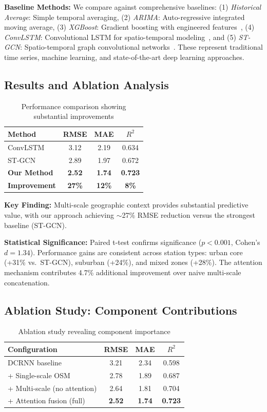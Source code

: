 \documentclass[10pt,twocolumn]{article}
\begin{document}
\textbf{Baseline Methods:} We compare against comprehensive baselines: (1) \textit{Historical Average}: Simple temporal averaging, (2) \textit{ARIMA}: Auto-regressive integrated moving average, (3) \textit{XGBoost}: Gradient boosting with engineered features~\cite{chen2016}, (4) \textit{ConvLSTM}: Convolutional LSTM for spatio-temporal modeling~\cite{xingjian2015}, and (5) \textit{ST-GCN}: Spatio-temporal graph convolutional networks~\cite{yu2018}. These represent traditional time series, machine learning, and state-of-the-art deep learning approaches.

\subsection{Results and Ablation Analysis}

\begin{table}[ht]
\centering
\caption{Performance comparison showing substantial improvements}
\small
\begin{tabular}{lccc}
\toprule
Method & RMSE & MAE & $R^2$ \\
\midrule
ConvLSTM & 3.12 & 2.19 & 0.634 \\
ST-GCN & 2.89 & 1.97 & 0.672 \\
\textbf{Our Method} & \textbf{2.52} & \textbf{1.74} & \textbf{0.723} \\
\textbf{Improvement} & \textbf{27\%} & \textbf{12\%} & \textbf{8\%} \\
\bottomrule
\end{tabular}
\end{table}

\textbf{Key Finding:} Multi-scale geographic context provides substantial predictive value, with our approach achieving $\sim$27\% RMSE reduction versus the strongest baseline (ST-GCN).

\textbf{Statistical Significance:} Paired t-test confirms significance ($p < 0.001$, Cohen's $d = 1.34$). Performance gains are consistent across station types: urban core (+31\% vs.\ ST-GCN), suburban (+24\%), and mixed zones (+28\%). The attention mechanism contributes 4.7\% additional improvement over naive multi-scale concatenation.

\subsection{Ablation Study: Component Contributions}

\begin{table}[ht]
\centering
\caption{Ablation study revealing component importance}
\small
\begin{tabular}{lccc}
\toprule
Configuration & RMSE & MAE & $R^2$ \\
\midrule
DCRNN baseline & 3.21 & 2.34 & 0.598 \\
+ Single-scale OSM & 2.78 & 1.89 & 0.687 \\
+ Multi-scale (no attention) & 2.64 & 1.81 & 0.704 \\
+ Attention fusion (full) & \textbf{2.52} & \textbf{1.74} & \textbf{0.723} \\
\bottomrule
\end{tabular}
\end{table}
\end{document}
